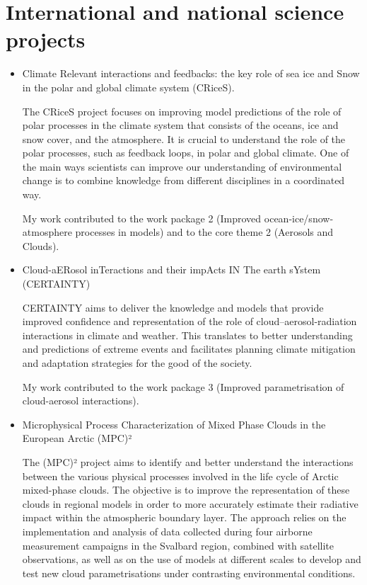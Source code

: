 \section*{International and national science projects}
    \begin{itemize}
        \item Climate Relevant interactions and feedbacks: the key role of sea ice and Snow in the polar and global climate system (CRiceS).

            The CRiceS project focuses on improving model predictions of the role of polar processes in the climate system that consists of the oceans, ice and snow cover, and the atmosphere. It is crucial to understand the role of the polar processes, such as feedback loops, in polar and global climate. One of the main ways scientists can improve our understanding of environmental change is to combine knowledge from different disciplines in a coordinated way.

            My work contributed to the work package 2 (Improved ocean-ice/snow-atmosphere processes in models) and to the core theme 2 (Aerosols and Clouds).

        \item Cloud-aERosol inTeractions and their impActs IN The earth sYstem (CERTAINTY)

            CERTAINTY aims to deliver the knowledge and models that provide improved confidence and representation of the role of cloud–aerosol-radiation interactions in climate and weather. This translates to better understanding and predictions of extreme events and facilitates planning climate mitigation and adaptation strategies for the good of the society.

            My work contributed to the work package 3 (Improved parametrisation of cloud-aerosol interactions).

        \item Microphysical Process Characterization of Mixed Phase Clouds in the European Arctic (MPC)²

    The (MPC)² project aims to identify and better understand the interactions between the various physical processes involved in the life cycle of Arctic mixed-phase clouds. The objective is to improve the representation of these clouds in regional models in order to more accurately estimate their radiative impact within the atmospheric boundary layer. The approach relies on the implementation and analysis of data collected during four airborne measurement campaigns in the Svalbard region, combined with satellite observations, as well as on the use of models at different scales to develop and test new cloud parametrisations under contrasting environmental conditions.


\end{itemize}
